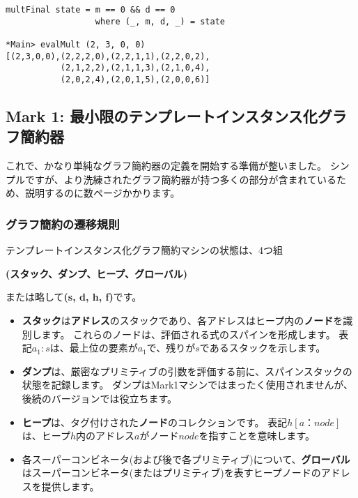 \documentclass{jarticle}
\begin{document}
\begin{verbatim}
multFinal state = m == 0 && d == 0
                  where (_, m, d, _) = state

*Main> evalMult (2, 3, 0, 0)
[(2,3,0,0),(2,2,2,0),(2,2,1,1),(2,2,0,2),
           (2,1,2,2),(2,1,1,3),(2,1,0,4),
           (2,0,2,4),(2,0,1,5),(2,0,0,6)]
\end{verbatim}

\subsection{Mark 1: 最小限のテンプレートインスタンス化グラフ簡約器}

これで、かなり単純なグラフ簡約器の定義を開始する準備が整いました。
シンプルですが、より洗練されたグラフ簡約器が持つ多くの部分が含まれているため、説明するのに数ページかかります。

\subsubsection{グラフ簡約の遷移規則}

テンプレートインスタンス化グラフ簡約マシンの状態は、4つ組

\begin{center}
	\textbf{(スタック、ダンプ、ヒープ、グローバル)}
\end{center}

または略して\textbf{(s, d, h, f)}です。

\begin{itemize}
	\item \textbf{スタック}は\textbf{アドレス}のスタックであり、各アドレスはヒープ内の\textbf{ノード}を識別します。
	      これらのノードは、評価される式のスパインを形成します。 表記$a_1 : s$は、最上位の要素が$a_1$で、残りが$s$であるスタックを示します。
	\item \textbf{ダンプ}は、厳密なプリミティブの引数を評価する前に、スパインスタックの状態を記録します。
	      ダンプはMark1マシンではまったく使用されませんが、後続のバージョンでは役立ちます。
	\item \textbf{ヒープ}は、タグ付けされた\textbf{ノード}のコレクションです。
	      表記$h [a：node]$は、ヒープ$h$内のアドレス$a$がノード$node$を指すことを意味します。
	\item 各スーパーコンビネータ(および後で各プリミティブ)について、\textbf{グローバル}はスーパーコンビネータ(またはプリミティブ)を表すヒープノードのアドレスを提供します。
\end{itemize}
\end{document}
